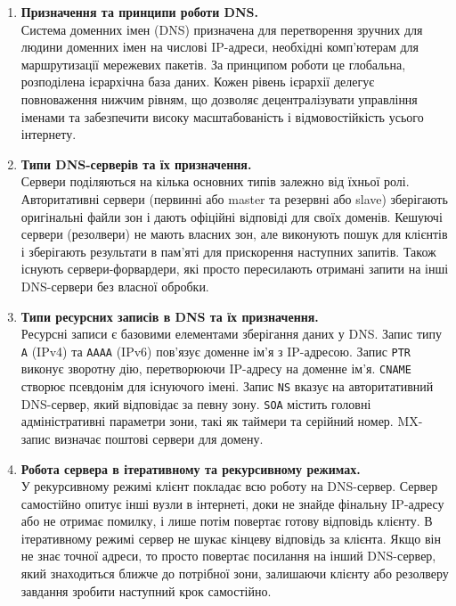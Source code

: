 \documentclass[14pt, a4paper]{extreport}
\begin{document}
	\begin{enumerate}
		\item \textbf{Призначення та принципи роботи DNS.} \\ Система доменних імен (DNS) призначена для перетворення зручних для людини доменних імен на числові IP-адреси, необхідні комп'ютерам для маршрутизації мережевих пакетів. За принципом роботи це глобальна, розподілена ієрархічна база даних. Кожен рівень ієрархії делегує повноваження нижчим рівням, що дозволяє децентралізувати управління іменами та забезпечити високу масштабованість і відмовостійкість усього інтернету.
		
		\item \textbf{Типи DNS-серверів та їх призначення.} \\ Сервери поділяються на кілька основних типів залежно від їхньої ролі. Авторитативні сервери (первинні або master та резервні або slave) зберігають оригінальні файли зон і дають офіційні відповіді для своїх доменів. Кешуючі сервери (резолвери) не мають власних зон, але виконують пошук для клієнтів і зберігають результати в пам'яті для прискорення наступних запитів. Також існують сервери-форвардери, які просто пересилають отримані запити на інші DNS-сервери без власної обробки.
		
		\item \textbf{Типи ресурсних записів в DNS та їх призначення.} \\ Ресурсні записи є базовими елементами зберігання даних у DNS. Запис типу \texttt{A} (IPv4) та \texttt{AAAA} (IPv6) пов'язує доменне ім'я з IP-адресою. Запис \texttt{PTR} виконує зворотну дію, перетворюючи IP-адресу на доменне ім'я. \texttt{CNAME} створює псевдонім для існуючого імені. Запис \texttt{NS} вказує на авторитативний DNS-сервер, який відповідає за певну зону. \texttt{SOA} містить головні адміністративні параметри зони, такі як таймери та серійний номер. MX-запис визначає поштові сервери для домену.
		
		\item \textbf{Робота сервера в ітеративному та рекурсивному режимах.} \\ У рекурсивному режимі клієнт покладає всю роботу на DNS-сервер. Сервер самостійно опитує інші вузли в інтернеті, доки не знайде фінальну IP-адресу або не отримає помилку, і лише потім повертає готову відповідь клієнту. В ітеративному режимі сервер не шукає кінцеву відповідь за клієнта. Якщо він не знає точної адреси, то просто повертає посилання на інший DNS-сервер, який знаходиться ближче до потрібної зони, залишаючи клієнту або резолверу завдання зробити наступний крок самостійно.
		

\end{enumerate}
\end{document}
